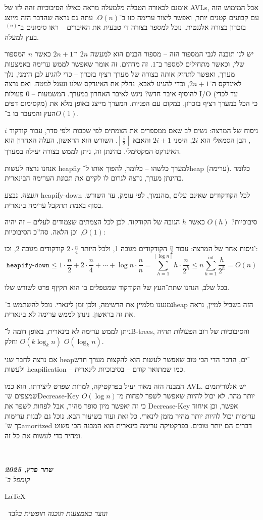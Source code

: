 \documentclass[]{article}
\newcommand\en[1] {\begin{otherlanguage}{english}#1\end{otherlanguage}}
\newcommand\ndoc  {\dotfill \\ \vfil {\begin{center}
            {\textbf{\textit{שחר פרץ, 2025}} \\
                \scriptsize \textit{קומפל ב־}\en{\LaTeX}\,\textit{ ונוצר באמצעות תוכנה חופשית בלבד}}
    \end{center}} \vfil	}
\newcommand\rf    {\right\rfloor}
\newcommand\lf    {\left\lfloor}
\newcommand\floor [1] {\lf #1 \rf}
\newcommand\logn  {\log n}
\begin{document}
    אומנם לכאורה הטבלה מלמעלה מראה כאילו הסיבוכיות זהה לזו של AVLs, אבל המימוש הזה עם קבועים קטנים יותר, ואפשר ליצור ערימה כזו ב־$O(n)$. עתה גם נראה שהדבר הזה מיוצג בזכרון בצורה אלגנטית. נוכל למספר בצורה די טבעית את האיברים – ראו סימונים ב־$\,^{(n)}$ בעץ למעלה. 
    
    יש לנו תובנה לגבי המספור הזה – מספור הבנים הוא למעשה $2n$ ו־$2n + 1$ כאשר $n$ המספור שלי, וכאשר מתחילים למספר ב־$1$. זה מדהים. זה אומר שאפשר לממש ערימה באמצעות מערך, ואפשר לתחזק אותה בצורה של מערך רציף בזכרון – כדי להגיע לבן הימני, נלך לאינדקס ה־$2n + 1$, וכדי להגיע לאבא, נחלק את האינדקס שלנו ונעגל למטה. ואם נרצה להוסיף איבר חדש? ניגש לאיבר האחרון במערך. המשמעות – $0$ פעולות I/O (עד לכדי מקסימום דפים) כי הכל במערך רציף בזכרון, במקום עם הפניות. המערך מייצג באופן מלא את העץ והמעבר בו ב־$O(1)$. 
    
    ניסוח של המרצה: נשים לב שאם ממספרים את הצמתים לפי שכבות ולפי סדר, עבור קודקוד $i$, הבן הסמאלי הוא $2i$, הימני $2i + 1$ והאבא $\floor{\frac{i}{2}}$. השורש הוא הראשון, העלה האחרון הוא האינדקס המקסימלי. בהינתן זה, ניתן לממש בצורה יעילה במערך. 
    
    אנחנו נרצה לעשות heapfiy למערך כלשהו – כלומר, להפוך אותו ל־heap (ערימה). כלומר בהינתן מערך, נרצה לגרום לו לקיים את תכונת הערימה הבינארית. 
    
    \textit{העצה: }נבצע heapify-down לכל הקודקודים שאינם עלים ,מהנמוך, לפי עומק, עד השורש. בסוף באמת תתקבל ערימה בינארית. 
    
    סיבוכיות? $O(h)$ כאשר $h$ הגובה של הקודקוד. לכן לכל הצמתים שצמודים לעלים – זה יהיה $O(1)$, וכן הלאה. סה''כ הסיבוכיות: 
    
    ניסוח אחר של המרצה: עבור $\frac{n}{2}$ הקודקודים מגובה 1, ולכל היותר $2 \cdot \frac{n}{4}$ קודקודים מגובה 2, וכו': 
    \[ \texttt{heapify-down} \le 1 \cdot \frac{n}{2} + 2 \cdot \frac{n}{4} + \cdots + \logn \cdot \frac{n}{n} = \sum_{h = 1}^{\floor{\logn}} h \cdot \frac{n}{2^{h}} \le n \sum_{h = 1}^{\inf}\frac{h}{2^h} = O(n) \]
    
    בכל שלב, הנחנו שתת־העץ של הקודקוד שמטפלים בו הוא תקיןף פרט לשורש שלו. 
    
    נמנענו מלמיין את הרשימה, ולכן זמן לינארי. נוכל להשתמש ב־heap הזה בשביל למיין, נראה את זה בראשון. נינתן לממש ערימה לא בינארית. 
   
    ניתן לממש ערימה לא בינארית, באופן דומה ל־B-trees, והסיבוכיות של רוב הפעולות תהיה $O(k \log_kn)$ וחלק $O(\log_kn)$. 
    
    אם נרצה לחבר שני heap־ים, הדבר הדי הכי טוב שאפשר לעשות הוא להקצות מערך חדש ולעשות heapification – כמו שמתואר קודם – בסיבוכיות לינארית. 
    
    המבנה הזה מאוד יעיל בפרקטיקה, למרות שפרט ליצירתו, הוא כמו AVL. יש אלגוריתמים שמצפים ש־Decrease-Key יותר מהר. לא יכול להיות שאפשר לשפר לפחות מ־$O(\logn)$ כי זה יאפשר מיון סופר מהיר, אבל לפחות לשפר את Decrease-Key אפשר, וכן איחוד ערימות יכול להיות יותר מהיר מזמן לינארי. כל זאת ועוד בשיעור הבא. נוכל גם לבנות ערימות כך ש־amoritzed דברים הם יותר טובים. בפרקטיקה ערימה בינארית הוא המבנה הכי פשוט ומהיר כדי לעשות את כל זה. 
    
    \ndoc
    
\end{document}
